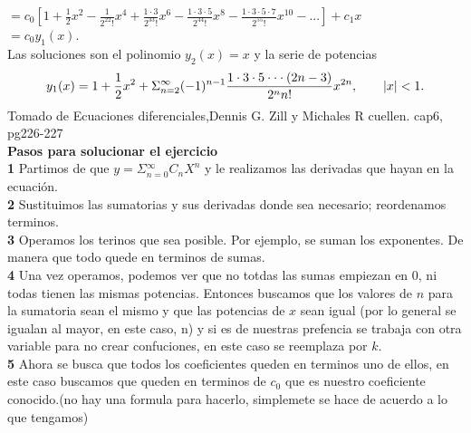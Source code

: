 \documentclass[12pt,letterpaper,oneside]{article}
\begin{document}
 \hspace*{0.3cm} $ =c_0 \left[ 1 + \frac{1}{2} x^2 - \frac{1}{2^22!} x^4 + \frac{1\cdot3}{2^33!}x^6 - \frac{1\cdot3\cdot5}{2^44!}x^8 - \frac{1\cdot3\cdot5\cdot7}{2^55!}x^10 - ... \right] + c_1x$ \vspace{0.3cm}\\
 \hspace*{0.3cm} $= c_0 y_1 (x)$.\vspace{0.3cm}\\
 Las soluciones son el polinomio $y_2 (x) = x$ y la serie de potencias\\
 \begin{align*}
 y_1 (x) = 1 + \frac{1}{2} x^2 + \Sigma{^\infty_{n=2}} (-1)^{n-1} \frac{1\cdot3\cdot5\cdot\cdot\cdot(2n - 3)}{2^nn!} x^{2n}, \hspace{0.7cm} |x| < 1.
 \end{align*}
 Tomado de Ecuaciones diferenciales,Dennis G. Zill y Michales R cuellen. cap6, pg226-227\\
 \textbf{Pasos para solucionar el ejercicio}\vspace{0.3cm}\\
 \hspace*{0.3cm} \textbf{1} Partimos de que $y = \Sigma{^\infty_{n=0}} C_n X^n$ y le realizamos las derivadas que hayan en la ecuación.\vspace{0.3cm}\\
 \hspace*{0.3cm} \textbf{2} Sustituimos las sumatorias y sus derivadas donde sea necesario; reordenamos terminos.\vspace{0.3cm}\\
  \hspace*{0.3cm} \textbf{3} Operamos los terinos que sea posible. Por ejemplo, se suman los exponentes. De manera que todo quede en terminos de sumas.\vspace{0.3cm}\\
  \hspace*{0.3cm} \textbf{4} Una vez operamos, podemos ver que no totdas las sumas empiezan en 0, ni todas tienen las mismas potencias. Entonces buscamos que los valores de $n$ para la sumatoria sean el mismo y que las potencias de $x$ sean igual (por lo general se igualan al mayor, en este caso, n) y si es de nuestras prefencia se trabaja con otra variable para no crear confuciones, en este caso se reemplaza por $k$.\vspace{0.3cm}\\
  \hspace*{0.3cm} \textbf{5} Ahora se busca que todos los coeficientes queden en terminos uno de ellos, en este caso buscamos que queden en terminos de $c_0$ que es nuestro coeficiente conocido.(no hay una formula para hacerlo, simplemete se hace de acuerdo a lo que tengamos)\vspace{0.3cm}\\
\end{document}
